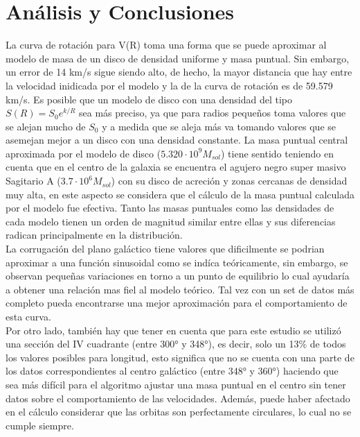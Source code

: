 \documentclass[letterpaper,oneside]{article}
\begin{document}
\section{Análisis y Conclusiones}
La curva de rotación para V(R) toma una forma que se puede aproximar al modelo de masa de un disco de densidad uniforme y masa puntual. Sin embargo, un error de 14 km/s sigue siendo alto, de hecho, la mayor distancia que hay entre la velocidad inidicada por el modelo y la de la curva de rotación es de 59.579 km/s. Es posible que un modelo de disco con una densidad del tipo $S(R) = S_0e^{k/R}$ sea más preciso, ya que para radios pequeños toma valores que se alejan mucho de $S_0$ y a medida que se aleja más va tomando valores que se asemejan mejor a un disco con una densidad constante. La masa puntual central aproximada por el modelo de disco ($5.320 \cdot 10^{9} M_{sol}$) tiene sentido teniendo en cuenta que en el centro de la galaxia se encuentra el agujero negro super masivo Sagitario A ($3.7 \cdot 10^{6} M_{sol}$) con su disco de acreción y zonas cercanas de densidad muy alta, en este aspecto se considera que el cálculo de la masa puntual calculada por el modelo fue efectiva.  Tanto las masas puntuales como las densidades de cada modelo tienen un orden de magnitud similar entre ellas y sus diferencias radican principalmente en la distribución.\\

La corrugación del plano galáctico tiene valores que dificilmente se podrian aproximar a una función sinusoidal como se indíca teóricamente, sin embargo, se observan pequeñas variaciones en torno a un punto de equilibrio lo cual ayudaría a obtener una relación mas fiel al modelo teórico. Tal vez con un set de datos más completo pueda encontrarse una mejor aproximación para el comportamiento de esta curva.\\

Por otro lado, también hay que tener en cuenta que para este estudio se utilizó una sección del \textrm{IV} cuadrante (entre 300° y 348°), es decir, solo un 13\% de todos los valores posibles para longitud, esto significa que no se cuenta con una parte de los datos correspondientes al centro galáctico (entre 348° y 360°) haciendo que sea más difícil para el algoritmo ajustar una masa puntual en el centro sin tener datos sobre el comportamiento de las velocidades. Además, puede haber afectado en el cálculo considerar que las orbitas son perfectamente circulares, lo cual no se cumple siempre.\\
\end{document}
